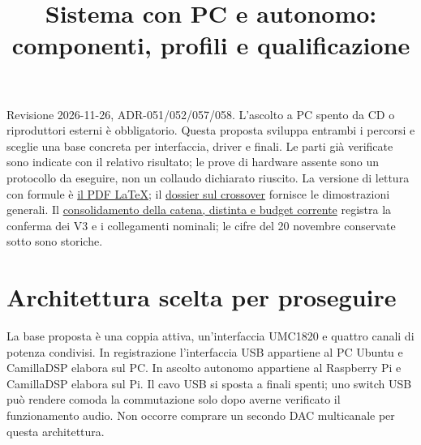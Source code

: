 \documentclass[
  italian,
  11pt,
  a4paper,
]{article}
\title{Sistema con PC e autonomo: componenti, profili e qualificazione}
\author{}
\date{}
\begin{document}
\maketitle

Revisione 2026-11-26, ADR-051/052/057/058. L'ascolto a PC spento da CD o riproduttori
esterni è obbligatorio. Questa proposta sviluppa entrambi i percorsi e sceglie una base
concreta per interfaccia, driver e finali. Le parti già verificate sono indicate con il
relativo risultato; le prove di hardware assente sono un protocollo da eseguire, non un
collaudo dichiarato riuscito. La versione di lettura con formule è
\href{../../docs/pdf/sistema-autonomo-driver-e-collaudo.pdf}{il PDF LaTeX}; il
\href{crossover-pc-pi-analogico.pdf}{dossier sul crossover} fornisce le dimostrazioni
generali. Il
\href{../../docs/67-catena-di-riferimento-e-dipendenze-esecutive.md}{consolidamento della
catena, distinta e budget corrente} registra la conferma dei V3 e i collegamenti nominali;
le cifre del 20 novembre conservate sotto sono storiche.

\section{Architettura scelta per proseguire}\label{architettura-scelta-per-proseguire}

La base proposta è una coppia attiva, un'interfaccia UMC1820 e quattro canali di potenza
condivisi. In registrazione l'interfaccia USB appartiene al PC Ubuntu e CamillaDSP elabora
sul PC. In ascolto autonomo appartiene al Raspberry Pi e CamillaDSP elabora sul Pi. Il cavo
USB si sposta a finali spenti; uno switch USB può rendere comoda la commutazione solo dopo
averne verificato il funzionamento audio. Non occorre comprare un secondo DAC multicanale
per questa architettura.
\end{document}
